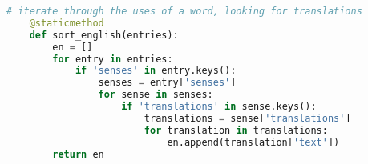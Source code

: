 \begin{lstlisting}[caption={[Translation Extraction Code] Python code for obtaining the translations of a word from the information provided by the \textit{Oxford Dictionaries API}}, label=lst:eng, breaklines=true, language=python, breakatwhitespace=true, float]
    # iterate through the uses of a word, looking for translations
    @staticmethod
    def sort_english(entries):
        en = []
        for entry in entries:
            if 'senses' in entry.keys():
                senses = entry['senses']
                for sense in senses:
                    if 'translations' in sense.keys():
                        translations = sense['translations']
                        for translation in translations:
                            en.append(translation['text'])
        return en

\end{lstlisting}
